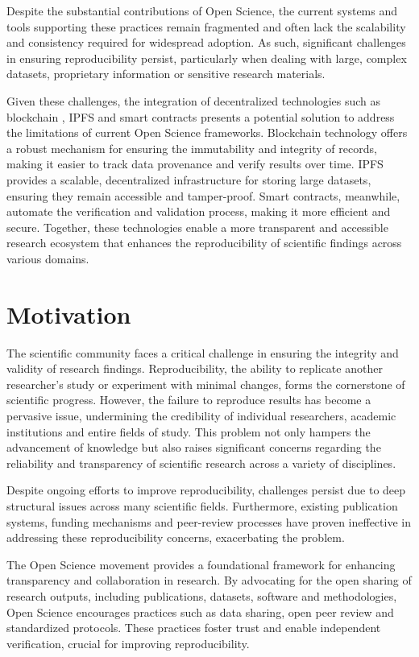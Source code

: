 \documentclass{article}
\begin{document}
Despite the substantial contributions of Open Science, the current systems and tools supporting these practices remain fragmented and often lack the scalability and consistency required for widespread adoption. As such, significant challenges in ensuring reproducibility persist, particularly when dealing with large, complex datasets, proprietary information  or sensitive research materials.

Given these challenges, the integration of decentralized technologies such as blockchain \cite{nakamoto2012bitcoin}, IPFS \cite{Benet} and smart contracts \cite{Szabo-1994}presents a potential solution to address the limitations of current Open Science frameworks. Blockchain technology offers a robust mechanism for ensuring the immutability and integrity of records, making it easier to track data provenance and verify results over time. IPFS provides a scalable, decentralized infrastructure for storing large datasets, ensuring they remain accessible and tamper-proof. Smart contracts, meanwhile, automate the verification and validation process, making it more efficient and secure. Together, these technologies enable a more transparent and accessible research ecosystem that enhances the reproducibility of scientific findings across various domains.

\section{Motivation}

The scientific community faces a critical challenge in ensuring the integrity and validity of research findings. Reproducibility, the ability to replicate another researcher's study or experiment with minimal changes, forms the cornerstone of scientific progress. However, the failure to reproduce results has become a pervasive issue, undermining the credibility of individual researchers, academic institutions and entire fields of study. This problem not only hampers the advancement of knowledge but also raises significant concerns regarding the reliability and transparency of scientific research across a variety of disciplines.

Despite ongoing efforts to improve reproducibility, challenges persist due to deep structural issues across many scientific fields. Furthermore, existing publication systems, funding mechanisms and peer-review processes have proven ineffective in addressing these reproducibility concerns, exacerbating the problem.

The Open Science movement provides a foundational framework for enhancing transparency and collaboration in research. By advocating for the open sharing of research outputs, including publications, datasets, software and methodologies, Open Science encourages practices such as data sharing, open peer review and standardized protocols. These practices foster trust and enable independent verification, crucial for improving reproducibility.
\end{document}
